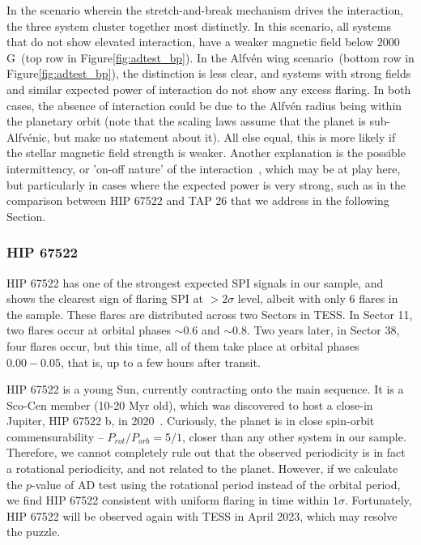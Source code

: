 \documentclass[twocolumn]{aastex631}
\begin{document}
In the scenario wherein the stretch-and-break mechanism drives the interaction, the three system cluster together most distinctly. In this scenario, all systems that do not show elevated interaction, have a weaker magnetic field below $2000\,$G~(top row in Figure\ref{fig:adtest_bp}). In the Alfv\'en wing scenario~(bottom row in Figure\ref{fig:adtest_bp}), the distinction is less clear, and systems with strong fields and similar expected power of interaction do not show any excess flaring. In both cases, the absence of interaction could be due to the Alfv\'en radius being within the planetary orbit (note that the scaling laws assume that the planet is sub-Alfv\'enic, but make no statement about it). All else equal, this is more likely if the stellar magnetic field strength is weaker. Another explanation is the possible intermittency, or 'on-off nature' of the interaction~\citep{shkolnik2008nature}, which may be at play here, but particularly in cases where the expected power is very strong, such as in the comparison between HIP 67522 and TAP 26 that we address in the following Section.

\subsubsection{HIP 67522}
\label{sec:results:individualstars:hip67522}
HIP 67522 has one of the strongest expected SPI signals in our sample, and shows the clearest sign of flaring SPI at $>2\sigma$ level, albeit with only 6 flares in the sample. These flares are distributed across two Sectors in TESS. In Sector 11, two flares occur at orbital phases $\sim 0.6$ and $\sim 0.8$. Two years later, in Sector 38, four flares occur, but this time, all of them take place at orbital phases $0.00-0.05$, that is, up to a few hours after transit.

HIP 67522 is a young Sun, currently contracting onto the main sequence. It is a Sco-Cen member (10-20 Myr old), which was discovered to host a close-in Jupiter, HIP 67522 b, in 2020~\citep{rizzuto2020tess}. Curiously, the planet is in close spin-orbit commensurability -- $P_{rot}/P_{orb}=5/1$, closer than any other system in our sample. Therefore, we cannot completely rule out that the observed periodicity is in fact a rotational periodicity, and not related to the planet. However, if we calculate the $p$-value of AD test using the rotational period instead of the orbital period, we find HIP 67522 consistent with uniform flaring in time within $1\sigma$. Fortunately, HIP 67522 will be observed again with TESS in April 2023, which may resolve the puzzle.
\end{document}
